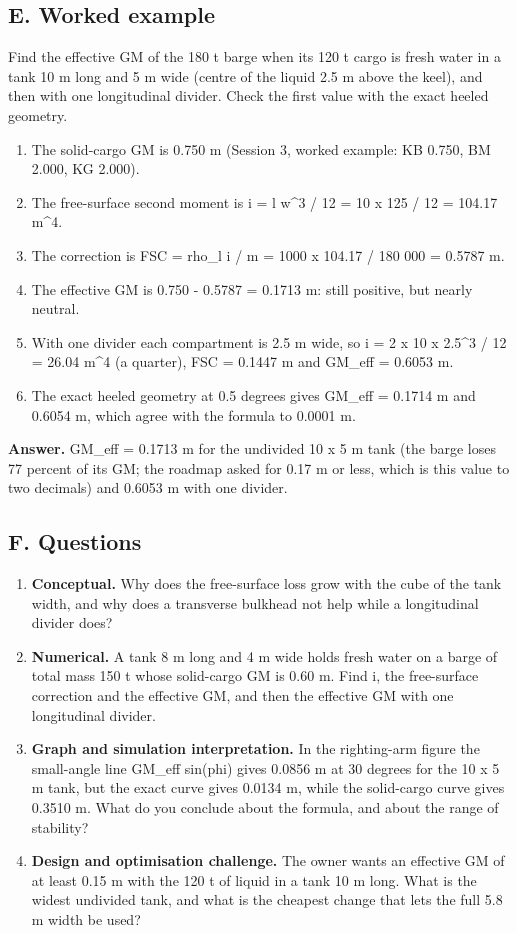 \documentclass[11pt,a4paper]{article}
\begin{document}
\subsection*{E. Worked example}
Find the effective GM of the 180 t barge when its 120 t cargo is fresh water in a tank 10 m long and 5 m wide (centre of the liquid 2.5 m above the keel), and then with one longitudinal divider. Check the first value with the exact heeled geometry.
\begin{enumerate}[nosep]
\item The solid-cargo GM is 0.750 m (Session 3, worked example: KB 0.750, BM 2.000, KG 2.000).
\item The free-surface second moment is i = l w\textasciicircum{}3 / 12 = 10 x 125 / 12 = 104.17 m\textasciicircum{}4.
\item The correction is FSC = rho\_l i / m = 1000 x 104.17 / 180 000 = 0.5787 m.
\item The effective GM is 0.750 - 0.5787 = 0.1713 m: still positive, but nearly neutral.
\item With one divider each compartment is 2.5 m wide, so i = 2 x 10 x 2.5\textasciicircum{}3 / 12 = 26.04 m\textasciicircum{}4 (a quarter), FSC = 0.1447 m and GM\_eff = 0.6053 m.
\item The exact heeled geometry at 0.5 degrees gives GM\_eff = 0.1714 m and 0.6054 m, which agree with the formula to 0.0001 m.
\end{enumerate}
\textbf{Answer.} GM\_eff = 0.1713 m for the undivided 10 x 5 m tank (the barge loses 77 percent of its GM; the roadmap asked for 0.17 m or less, which is this value to two decimals) and 0.6053 m with one divider.

\subsection*{F. Questions}
\begin{enumerate}[nosep]
\item \textbf{Conceptual.} Why does the free-surface loss grow with the cube of the tank width, and why does a transverse bulkhead not help while a longitudinal divider does?
\item \textbf{Numerical.} A tank 8 m long and 4 m wide holds fresh water on a barge of total mass 150 t whose solid-cargo GM is 0.60 m. Find i, the free-surface correction and the effective GM, and then the effective GM with one longitudinal divider.
\item \textbf{Graph and simulation interpretation.} In the righting-arm figure the small-angle line GM\_eff sin(phi) gives 0.0856 m at 30 degrees for the 10 x 5 m tank, but the exact curve gives 0.0134 m, while the solid-cargo curve gives 0.3510 m. What do you conclude about the formula, and about the range of stability?
\item \textbf{Design and optimisation challenge.} The owner wants an effective GM of at least 0.15 m with the 120 t of liquid in a tank 10 m long. What is the widest undivided tank, and what is the cheapest change that lets the full 5.8 m width be used?
\end{enumerate}
\end{document}
